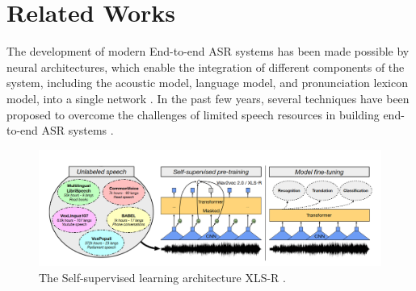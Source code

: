 \documentclass[runningheads]{llncs}
\begin{document}

% 





\section{Related Works}
\label{sec:relatedworks}

The development of modern End-to-end ASR systems has been made possible by neural architectures, which enable the integration of different components of the system, including the acoustic model, language model, and pronunciation lexicon model, into a single network \cite{georgescu2021performance}. 
In the past  few years, several  techniques have been proposed to overcome the challenges of limited speech resources in building end-to-end ASR systems \cite{barrault2023seamless,pratap2024scaling,whisper} .


\begin{figure}[htpb]
    \includegraphics[width=\textwidth]{XLS-R.png}
    \caption{The Self-supervised learning architecture XLS-R \cite{babu2021xls}.} \label{XLS-R}
\end{figure}
\end{document}
